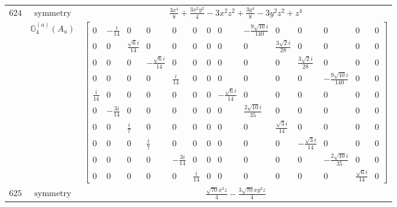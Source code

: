 \documentclass[fleqn,8pt,landscape]{jsarticle}
\begin{document}
\begin{longtable}{ccc}
$ 624 $ & $ \text{symmetry} $ & $ \frac{3 x^{4}}{8} + \frac{3 x^{2} y^{2}}{4} - 3 x^{2} z^{2} + \frac{3 y^{4}}{8} - 3 y^{2} z^{2} + z^{4} $ \\
$  $ & $ \mathbb{G}_{4}^{(a)}(A_{u}) $ & $ \begin{bmatrix} 0 & - \frac{i}{14} & 0 & 0 & 0 & 0 & 0 & 0 & - \frac{9 \sqrt{10} i}{140} & 0 & 0 & 0 & 0 & 0 \\ 0 & 0 & \frac{\sqrt{6} i}{14} & 0 & 0 & 0 & 0 & 0 & 0 & \frac{3 \sqrt{2} i}{28} & 0 & 0 & 0 & 0 \\ 0 & 0 & 0 & - \frac{\sqrt{6} i}{14} & 0 & 0 & 0 & 0 & 0 & 0 & \frac{3 \sqrt{2} i}{28} & 0 & 0 & 0 \\ 0 & 0 & 0 & 0 & \frac{i}{14} & 0 & 0 & 0 & 0 & 0 & 0 & - \frac{9 \sqrt{10} i}{140} & 0 & 0 \\ \frac{i}{14} & 0 & 0 & 0 & 0 & 0 & 0 & - \frac{\sqrt{6} i}{14} & 0 & 0 & 0 & 0 & 0 & 0 \\ 0 & - \frac{3 i}{14} & 0 & 0 & 0 & 0 & 0 & 0 & \frac{2 \sqrt{10} i}{35} & 0 & 0 & 0 & 0 & 0 \\ 0 & 0 & \frac{i}{7} & 0 & 0 & 0 & 0 & 0 & 0 & \frac{\sqrt{3} i}{14} & 0 & 0 & 0 & 0 \\ 0 & 0 & 0 & \frac{i}{7} & 0 & 0 & 0 & 0 & 0 & 0 & - \frac{\sqrt{3} i}{14} & 0 & 0 & 0 \\ 0 & 0 & 0 & 0 & - \frac{3 i}{14} & 0 & 0 & 0 & 0 & 0 & 0 & - \frac{2 \sqrt{10} i}{35} & 0 & 0 \\ 0 & 0 & 0 & 0 & 0 & \frac{i}{14} & 0 & 0 & 0 & 0 & 0 & 0 & \frac{\sqrt{6} i}{14} & 0 \end{bmatrix} $ \\ \hline
$ 625 $ & $ \text{symmetry} $ & $ \frac{\sqrt{70} x^{3} z}{4} - \frac{3 \sqrt{70} x y^{2} z}{4} $ \\

\end{longtable}
\end{document}
